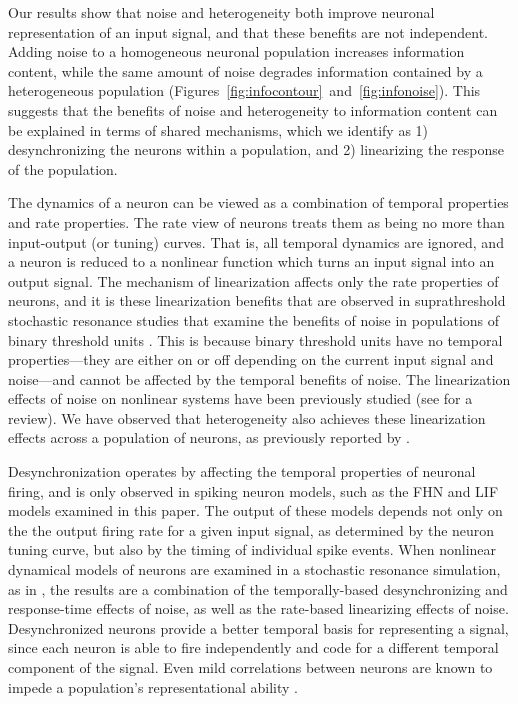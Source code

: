 \documentclass[12pt]{article}
\begin{document}
Our results show that noise and heterogeneity both improve neuronal representation of an input signal, and that these benefits are not independent. Adding noise to a homogeneous neuronal population increases information content, while the same amount of noise degrades information contained by a heterogeneous population (Figures~\ref{fig:infocontour}~and~\ref{fig:infonoise}). This suggests that the benefits of noise and heterogeneity to information content can be explained in terms of shared mechanisms, which we identify as 1) desynchronizing the neurons within a population, and 2) linearizing the response of the population.

The dynamics of a neuron can be viewed as a combination of temporal properties and rate properties. The rate view of neurons treats them as being no more than input-output (or tuning) curves. That is, all temporal dynamics are ignored, and a neuron is reduced to a nonlinear function which turns an input signal into an output signal. The mechanism of linearization affects only the rate properties of neurons, and it is these linearization benefits that are observed in suprathreshold stochastic resonance studies that examine the benefits of noise in populations of binary threshold units \citep{Stocks2000,Stocks2001a,McDonnell2006}. This is because binary threshold units have no temporal properties---they are either on or off depending on the current input signal and noise---and cannot be affected by the temporal benefits of noise. The linearization effects of noise on nonlinear systems have been previously studied (see \cite{Stocks1996} for a review). We have observed that heterogeneity also achieves these linearization effects across a population of neurons, as previously reported by \cite{Eliasmith2003}.

Desynchronization operates by affecting the temporal properties of neuronal firing, and is only observed in spiking neuron models, such as the FHN and LIF models examined in this paper. The output of these models depends not only on the the output firing rate for a given input signal, as determined by the neuron tuning curve, but also by the timing of individual spike events. When nonlinear dynamical models of neurons are examined in a stochastic resonance simulation, as in \cite{Stocks2001}, the results are a combination of the temporally-based desynchronizing and response-time effects of noise, as well as the rate-based linearizing effects of noise.  Desynchronized neurons provide a better temporal basis for representing a signal, since each neuron is able to fire independently and code for a different temporal component of the signal. Even mild correlations between neurons are known to impede a population's representational ability \citep{Zohary1994}.
\end{document}
